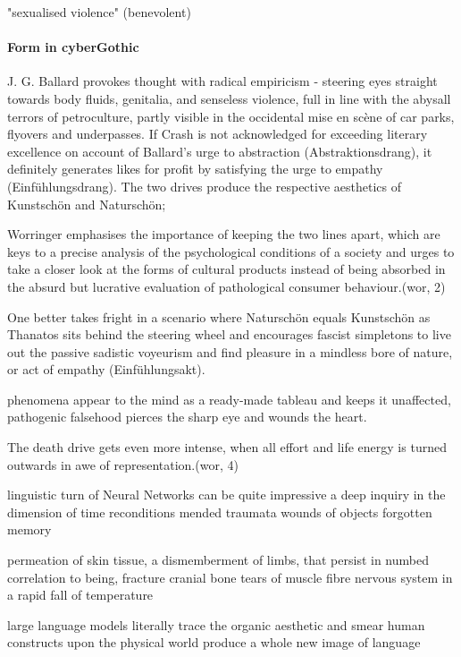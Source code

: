 \documentclass{article}
\begin{document}
"sexualised violence" (benevolent)

\paragraph{Form in cyberGothic} 
J. G. Ballard provokes thought with radical empiricism - 
steering eyes straight towards body fluids, genitalia, 
and senseless violence, 
full in line with the abysall terrors of petroculture, 
partly visible in the occidental mise en sc\`{e}ne 
of car parks, flyovers and underpasses.
If Crash is not acknowledged for exceeding literary excellence 
on account of Ballard's urge to abstraction (Abstraktionsdrang), 
it definitely generates likes for profit 
by satisfying the urge to empathy (Einf\"{u}hlungsdrang).
The two drives produce the respective 
aesthetics of Kunstsch\"{o}n and Natursch\"{o}n; 

Worringer emphasises the importance of 
keeping the two lines apart, which are 
keys to a precise analysis of 
the psychological conditions of a society 
and urges to take a closer look at the forms of cultural products 
instead of being absorbed in the
absurd but lucrative evaluation of pathological consumer behaviour.(wor, 2)

One better takes fright in a scenario 
where Natursch\"{o}n equals Kunstsch\"{o}n 
as Thanatos sits behind the steering wheel 
and encourages fascist simpletons
to live out the passive sadistic voyeurism and 
find pleasure in 
a mindless bore of nature, or act of empathy (Einf\"{u}hlungsakt).


phenomena appear to the mind as a ready-made tableau 
and keeps it unaffected,
pathogenic falsehood pierces the sharp eye 
and wounds the heart.

The death drive gets even more intense, 
when all effort and life energy
is turned outwards in awe of representation.(wor, 4) 

linguistic turn of Neural Networks can be quite impressive
a deep inquiry in the dimension of time
reconditions 
mended traumata wounds of objects forgotten memory 

permeation of skin tissue, 
a dismemberment of limbs, that persist in numbed correlation to being, 
fracture cranial bone
tears of muscle fibre
nervous system in a rapid fall of temperature

large language models literally trace the organic aesthetic 
and smear human constructs upon the physical world
produce a whole new image of language
\end{document}

